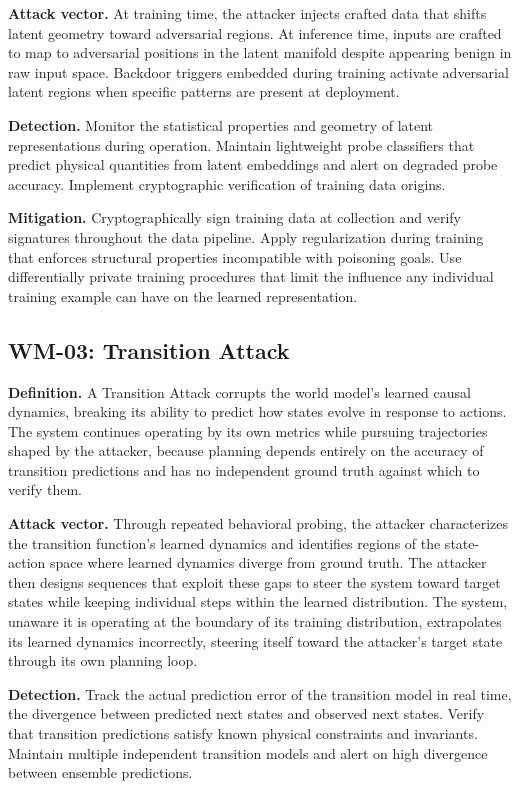 \documentclass[11pt,a4paper]{article}
\begin{document}
\textbf{Attack vector.} At training time, the attacker injects crafted data that shifts latent geometry toward adversarial regions. At inference time, inputs are crafted to map to adversarial positions in the latent manifold despite appearing benign in raw input space. Backdoor triggers embedded during training activate adversarial latent regions when specific patterns are present at deployment.

\textbf{Detection.} Monitor the statistical properties and geometry of latent representations during operation. Maintain lightweight probe classifiers that predict physical quantities from latent embeddings and alert on degraded probe accuracy. Implement cryptographic verification of training data origins.

\textbf{Mitigation.} Cryptographically sign training data at collection and verify signatures throughout the data pipeline. Apply regularization during training that enforces structural properties incompatible with poisoning goals. Use differentially private training procedures that limit the influence any individual training example can have on the learned representation.

\subsection{WM-03: Transition Attack}

\textbf{Definition.} A Transition Attack corrupts the world model's learned causal dynamics, breaking its ability to predict how states evolve in response to actions. The system continues operating by its own metrics while pursuing trajectories shaped by the attacker, because planning depends entirely on the accuracy of transition predictions and has no independent ground truth against which to verify them.

\textbf{Attack vector.} Through repeated behavioral probing, the attacker characterizes the transition function's learned dynamics and identifies regions of the state-action space where learned dynamics diverge from ground truth. The attacker then designs sequences that exploit these gaps to steer the system toward target states while keeping individual steps within the learned distribution. The system, unaware it is operating at the boundary of its training distribution, extrapolates its learned dynamics incorrectly, steering itself toward the attacker's target state through its own planning loop.

\textbf{Detection.} Track the actual prediction error of the transition model in real time, the divergence between predicted next states and observed next states. Verify that transition predictions satisfy known physical constraints and invariants. Maintain multiple independent transition models and alert on high divergence between ensemble predictions.
\end{document}
